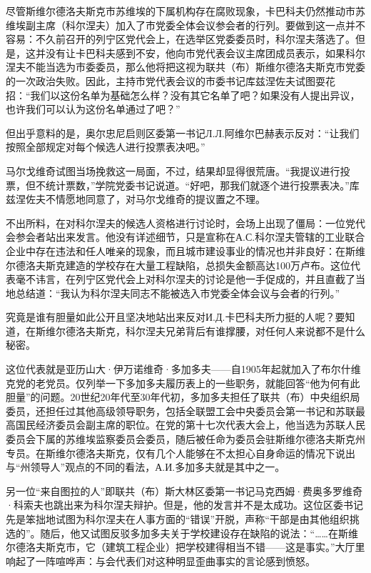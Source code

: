 尽管斯维尔德洛夫斯克市苏维埃的下属机构存在腐败现象，卡巴科夫仍然推动市苏维埃副主席（科尔涅夫）加入了市党委全体会议参会者的行列。要做到这一点并不容易：不久前召开的列宁区党代会上，在选举区党委委员时，科尔涅夫落选了。但是，这并没有让卡巴科夫感到不安，他向市党代表会议主席团成员表示，如果科尔涅夫不能当选为市委委员，那么他将把这视为联共（布）斯维尔德洛夫斯克市党委的一次政治失败。因此，主持市党代表会议的市委书记库兹涅佐夫试图耍花招：“我们以这份名单为基础怎么样？没有其它名单了吧？如果没有人提出异议，也许我们可以认为这份名单通过了吧？”

但出乎意料的是，奥尔忠尼启则区委第一书记Л.Л.阿维尔巴赫表示反对：“让我们按照全部规定对每个候选人进行投票表决吧。”

马尔戈维奇试图当场挽救这一局面，不过，结果却显得很荒唐。“我提议进行投票，但不统计票数，”学院党委书记说道。“好吧，那我们就逐个进行投票表决。”库兹涅佐夫不情愿地同意了，对马尔戈维奇的提议置之不理。

不出所料，在对科尔涅夫的候选人资格进行讨论时，会场上出现了僵局：一位党代会参会者站出来发言。他没有详述细节，只是宣称在А.С.科尔涅夫管辖的工业联合企业中存在违法和任人唯亲的现象，而且城市建设事业的情况也并非良好：在斯维尔德洛夫斯克建造的学校存在大量工程缺陷，总损失金额高达100万卢布。这位代表毫不讳言，在列宁区党代会上对科尔涅夫的讨论是他一手促成的，并且直截了当地总结道：“我认为科尔涅夫同志不能被选入市党委全体会议与会者的行列。”

究竟是谁有胆量如此公开且坚决地站出来反对И.Д.卡巴科夫所力挺的人呢？要知道，在斯维尔德洛夫斯克，科尔涅夫兄弟背后有谁撑腰，对任何人来说都不是什么秘密。

这位代表就是亚历山大·伊万诺维奇·多加多夫——自1905年起就加入了布尔什维克党的老党员。仅列举一下多加多夫履历表上的一些职务，就能回答“他为何有此胆量”的问题。20世纪20年代至30年代初，多加多夫担任了联共（布）中央组织局委员，还担任过其他高级领导职务，包括全联盟工会中央委员会第一书记和苏联最高国民经济委员会副主席的职位。在党的第十七次代表大会上，他当选为苏联人民委员会下属的苏维埃监察委员会委员，随后被任命为委员会驻斯维尔德洛夫斯克州专员。在斯维尔德洛夫斯克，仅有几个人能够在不太担心自身命运的情况下说出与“州领导人”观点的不同的看法，А.И.多加多夫就是其中之一。

另一位“来自图拉的人”即联共（布）斯大林区委第一书记马克西姆·费奥多罗维奇·科索夫也跳出来为科尔涅夫辩护。但是，他的发言并不是太成功。这位区委书记先是笨拙地试图为科尔涅夫在人事方面的“错误”开脱，声称“干部是由其他组织挑选的”。随后，他又试图反驳多加多夫关于学校建设存在缺陷的说法：“……在斯维尔德洛夫斯克市，它（建筑工程企业）把学校建得相当不错——这是事实。”大厅里响起了一阵喧哗声：与会代表们对这种明显歪曲事实的言论感到愤怒。

